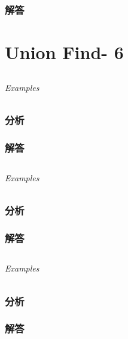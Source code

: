 \documentclass[UTF8,a4paper,12pt]{ctexbook}
\begin{document}
	\subsection{解答}
\chapter{Union Find- 6}	
\section{}
	
	\subparagraph{Examples}
	
	\subsection{分析}
	
	\subsection{解答}
	
\section{}
	
	\subparagraph{Examples}
	
	\subsection{分析}
	
	\subsection{解答}
	
	
\section{}
	
	\subparagraph{Examples}
	
	\subsection{分析}
	
	\subsection{解答}
	
\section{}
	
\end{document}

